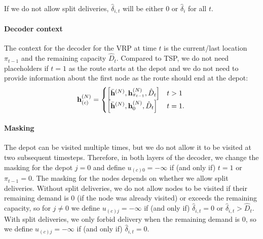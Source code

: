 If we do not allow split deliveries, $\hat{\delta}_{i,t}$ will be either 0 or $\hat{\delta}_{i}$ for all $t$.

\paragraph{Decoder context}
The context for the decoder for the VRP at time $t$ is the current/last location $\pi_{t-1}$ and the remaining capacity $\hat{D}_t$. Compared to TSP, we do not need placeholders if $t=1$ as the route starts at the depot and we do not need to provide information about the first node as the route should end at the depot:
\begin{equation}
	\mathbf{h}_{(c)}^{(N)} = \begin{cases}
		\left[\bar{\mathbf{h}}^{(N)} , \mathbf{h}^{(N)}_{\pi_{t-1}} , \hat{D}_t \right] & t > 1 \\
        \left[\bar{\mathbf{h}}^{(N)} , \mathbf{h}^{(N)}_0 , \hat{D}_t \right] & t = 1.
\end{cases} \\
\end{equation}

\paragraph{Masking}
The depot can be visited multiple times, but we do not allow it to be visited at two subsequent timesteps. Therefore, in both layers of the decoder, we change the masking for the depot $j = 0$ and define $u_{(c)0} = - \infty$ if (and only if) $t = 1$ or $\pi_{t-1} = 0$. The masking for the nodes depends on whether we allow split deliveries. Without split deliveries, we do not allow nodes to be visited if their remaining demand is 0 (if the node was already visited) or exceeds the remaining capacity, so for $j \neq 0$ we define $u_{(c)j} = - \infty$ if (and only if) $\hat{\delta}_{i,t} = 0 \text{ or } \hat{\delta}_{i,t} > \hat{D}_t$. With split deliveries, we only forbid delivery when the remaining demand is 0, so we define $u_{(c)j} = - \infty$ if (and only if) $\hat{\delta}_{i,t} = 0$.

